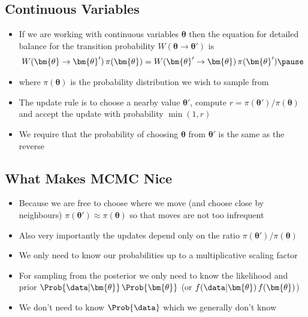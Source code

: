 
\begin{slide}
\section{Continuous Variables}

\begin{PauseHighLight}
  \begin{itemize}
  \item If we are working with continuous variables $\bm{\theta}$ then
    the equation for detailed balance for the transition probability
    $W(\bm{\theta}\rightarrow \bm{\theta}')$ is
    \begin{align*}
      W(\bm{\theta}\rightarrow \bm{\theta}')\, \pi(\bm{\theta}) =
      W(\bm{\theta}'\rightarrow \bm{\theta})\, \pi(\bm{\theta}') \pause
    \end{align*}
  \item where $\pi(\bm{\theta})$ is the probability distribution we wish
    to sample from\pause
  \item The update rule is to choose a nearby value $\bm{\theta}'$,
    compute $r = \pi(\bm{\theta}')/\pi(\bm{\theta})$ and accept the
    update with probability $\min(1,r)$\pause
  \item We require that the probability of choosing $\bm{\theta}$ from
    $\bm{\theta}'$ is the same as the reverse\pause
  \end{itemize}
\end{PauseHighLight}

\end{slide}



\begin{slide}
\section{What Makes MCMC Nice}

\begin{PauseHighLight}
  \begin{itemize}
  \item Because we are free to choose where we move (and choose close
    by neighbours) $\pi(\bm{\theta}') \approx \pi(\bm{\theta})$ so that moves are not too
    infrequent\pause
  \item Also very importantly the updates depend only on the ratio
    $\pi(\bm{\theta}')/\pi(\bm{\theta})$\pause
  \item We only need to know our probabilities up to a multiplicative
    scaling factor\pause
  \item For sampling from the posterior we only need to know the
    likelihood and prior $\Prob{\data| \bm{\theta}}\,\Prob{\bm{\theta}}$\pause{}
    (or $f(\data| \bm{\theta})\,f(\bm{\theta})$)\pauseb
  \item We don't need to know $\Prob{\data}$ which we generally don't
    know\pause
  \end{itemize}
\end{PauseHighLight}

\end{slide}

